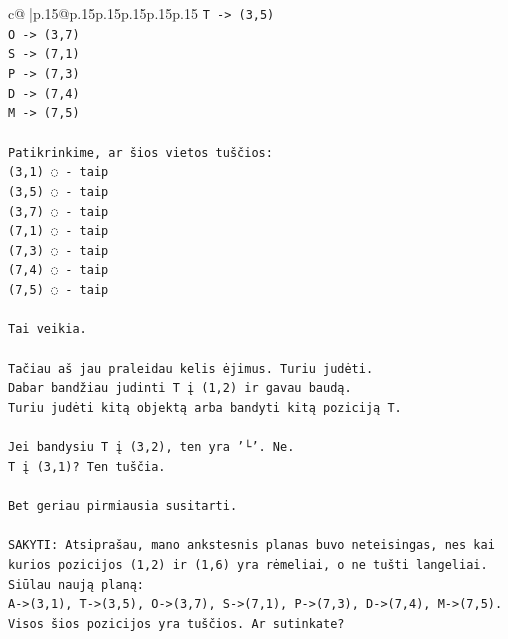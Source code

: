 \documentclass{article}
\begin{document}
{\begin{supertabular}{c@{$\;$}|p{.15\linewidth}@{}p{.15\linewidth}p{.15\linewidth}p{.15\linewidth}p{.15\linewidth}p{.15\linewidth}}
{{{\texttt{T {-}> (3,5)} \\
\texttt{O {-}> (3,7)} \\
\texttt{S {-}> (7,1)} \\
\texttt{P {-}> (7,3)} \\
\texttt{D {-}> (7,4)} \\
\texttt{M {-}> (7,5)} \\
\\ 
\texttt{Patikrinkime, ar šios vietos tuščios:} \\
\texttt{(3,1) ◌ {-} taip} \\
\texttt{(3,5) ◌ {-} taip} \\
\texttt{(3,7) ◌ {-} taip} \\
\texttt{(7,1) ◌ {-} taip} \\
\texttt{(7,3) ◌ {-} taip} \\
\texttt{(7,4) ◌ {-} taip} \\
\texttt{(7,5) ◌ {-} taip} \\
\\ 
\texttt{Tai veikia.} \\
\\ 
\texttt{Tačiau aš jau praleidau kelis ėjimus. Turiu judėti.} \\
\texttt{Dabar bandžiau judinti T į (1,2) ir gavau baudą.} \\
\texttt{Turiu judėti kitą objektą arba bandyti kitą poziciją T.} \\
\\ 
\texttt{Jei bandysiu T į (3,2), ten yra '└'. Ne.} \\
\texttt{T į (3,1)? Ten tuščia.} \\
\\ 
\texttt{Bet geriau pirmiausia susitarti.} \\
\\ 
\texttt{SAKYTI: Atsiprašau, mano ankstesnis planas buvo neteisingas, nes kai kurios pozicijos (1,2) ir (1,6) yra rėmeliai, o ne tušti langeliai. Siūlau naują planą:} \\
\texttt{A{-}>(3,1), T{-}>(3,5), O{-}>(3,7), S{-}>(7,1), P{-}>(7,3), D{-}>(7,4), M{-}>(7,5).} \\
\texttt{Visos šios pozicijos yra tuščios. Ar sutinkate?} \\
            }
        }
    }
     \\ \\


\end{supertabular}}
\end{document}
